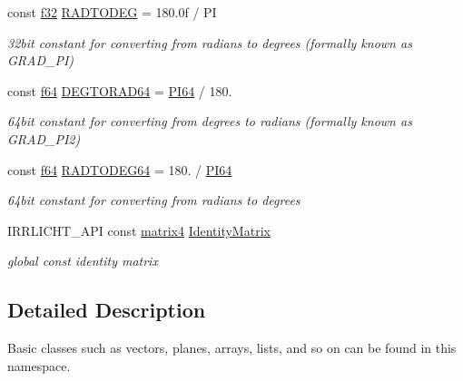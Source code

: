 \begin{DoxyCompactItemize}
const \hyperlink{namespaceirr_a0277be98d67dc26ff93b1a6a1d086b07}{f32} \hyperlink{namespaceirr_1_1core_ae3a530e0ef661960b7af89f07d817bd5}{R\+A\+D\+T\+O\+D\+EG} = 180.\+0f / PI
\begin{DoxyCompactList}\small\item\em 32bit constant for converting from radians to degrees (formally known as G\+R\+A\+D\+\_\+\+PI) \end{DoxyCompactList}\item 
\mbox{\label{namespaceirr_1_1core_a8e21b5969c8292857f7c9c5dcfd61c35}} 
const \hyperlink{namespaceirr_a1325b02603ad449f92c68fc640af9b28}{f64} \hyperlink{namespaceirr_1_1core_a8e21b5969c8292857f7c9c5dcfd61c35}{D\+E\+G\+T\+O\+R\+A\+D64} = \hyperlink{namespaceirr_1_1core_a166af519140dc00cbd88684e835086f8}{P\+I64} / 180.
\begin{DoxyCompactList}\small\item\em 64bit constant for converting from degrees to radians (formally known as G\+R\+A\+D\+\_\+\+P\+I2) \end{DoxyCompactList}\item 
\mbox{\label{namespaceirr_1_1core_ae7afeb48af12f5f5130cd179a644ec58}} 
const \hyperlink{namespaceirr_a1325b02603ad449f92c68fc640af9b28}{f64} \hyperlink{namespaceirr_1_1core_ae7afeb48af12f5f5130cd179a644ec58}{R\+A\+D\+T\+O\+D\+E\+G64} = 180. / \hyperlink{namespaceirr_1_1core_a166af519140dc00cbd88684e835086f8}{P\+I64}
\begin{DoxyCompactList}\small\item\em 64bit constant for converting from radians to degrees \end{DoxyCompactList}\item 
\mbox{\label{namespaceirr_1_1core_ac4561f3920d3fbfbfff74c9bed1f2713}} 
I\+R\+R\+L\+I\+C\+H\+T\+\_\+\+A\+PI const \hyperlink{namespaceirr_1_1core_a4c9d4e29899535971052810954a14431}{matrix4} \hyperlink{namespaceirr_1_1core_ac4561f3920d3fbfbfff74c9bed1f2713}{Identity\+Matrix}
\begin{DoxyCompactList}\small\item\em global const identity matrix \end{DoxyCompactList}\end{DoxyCompactItemize}


\subsection{Detailed Description}
Basic classes such as vectors, planes, arrays, lists, and so on can be found in this namespace. 


